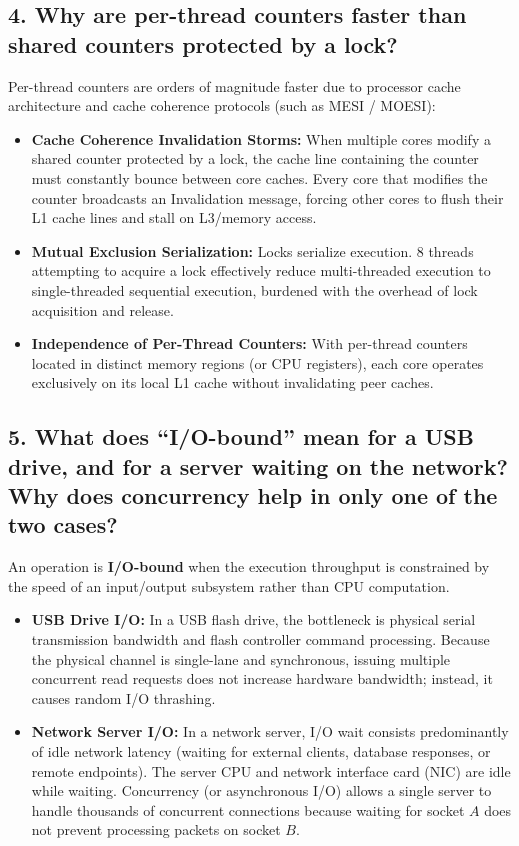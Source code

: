\documentclass[12pt,a4paper]{article}
\begin{document}
\subsection{4. Why are per-thread counters faster than shared counters protected by a lock?}
Per-thread counters are orders of magnitude faster due to processor cache architecture and cache coherence protocols (such as MESI / MOESI):
\begin{itemize}
    \item \textbf{Cache Coherence Invalidation Storms:} When multiple cores modify a shared counter protected by a lock, the cache line containing the counter must constantly bounce between core caches. Every core that modifies the counter broadcasts an Invalidation message, forcing other cores to flush their L1 cache lines and stall on L3/memory access.
    \item \textbf{Mutual Exclusion Serialization:} Locks serialize execution. 8 threads attempting to acquire a lock effectively reduce multi-threaded execution to single-threaded sequential execution, burdened with the overhead of lock acquisition and release.
    \item \textbf{Independence of Per-Thread Counters:} With per-thread counters located in distinct memory regions (or CPU registers), each core operates exclusively on its local L1 cache without invalidating peer caches.
\end{itemize}

\subsection{5. What does ``I/O-bound'' mean for a USB drive, and for a server waiting on the network? Why does concurrency help in only one of the two cases?}
An operation is \textbf{I/O-bound} when the execution throughput is constrained by the speed of an input/output subsystem rather than CPU computation.
\begin{itemize}
    \item \textbf{USB Drive I/O:} In a USB flash drive, the bottleneck is physical serial transmission bandwidth and flash controller command processing. Because the physical channel is single-lane and synchronous, issuing multiple concurrent read requests does not increase hardware bandwidth; instead, it causes random I/O thrashing.
    \item \textbf{Network Server I/O:} In a network server, I/O wait consists predominantly of idle network latency (waiting for external clients, database responses, or remote endpoints). The server CPU and network interface card (NIC) are idle while waiting. Concurrency (or asynchronous I/O) allows a single server to handle thousands of concurrent connections because waiting for socket $A$ does not prevent processing packets on socket $B$.
\end{itemize}
\end{document}
